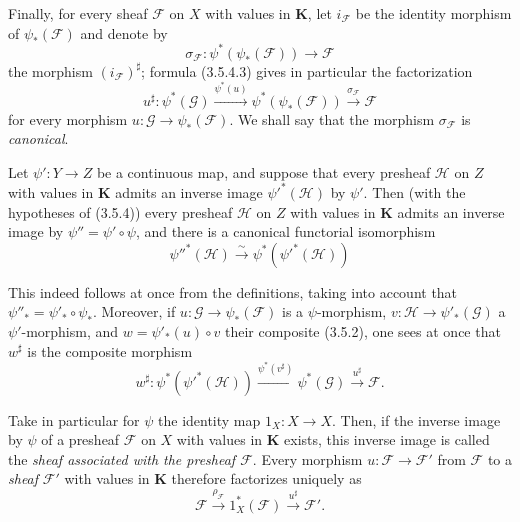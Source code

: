 \begin{env}[3.5.4]
Finally, for every sheaf $\mathcal{F}$ on $X$ with values in
$\mathbf{K}$, let $i_{\mathcal{F}}$ be the identity morphism of
$\psi_*(\mathcal{F})$ and denote by
\[
  \sigma_{\mathcal{F}}:
  \psi^*(\psi_*(\mathcal{F}))\to\mathcal{F}
\]
the morphism $(i_{\mathcal{F}})^\sharp$; formula (3.5.4.3) gives in
particular the factorization
\begin{equation*}
  u^\sharp:\psi^*(\mathcal{G})
  \xrightarrow{\psi^*(u)}
  \psi^*(\psi_*(\mathcal{F}))
  \xrightarrow{\sigma_{\mathcal{F}}}\mathcal{F}
\tag{3.5.4.4}\label{0.3.5.4.4}
\end{equation*}
for every morphism $u:\mathcal{G}\to\psi_*(\mathcal{F})$. We shall say that the
morphism $\sigma_{\mathcal{F}}$ is \emph{canonical}.
\end{env}

\begin{env}[3.5.5]
\label{0.3.5.5}
Let $\psi':Y\to Z$ be a continuous map, and suppose that every
presheaf $\mathcal{H}$ on $Z$ with values in $\mathbf{K}$ admits an
inverse image $\psi'^*(\mathcal{H})$ by $\psi'$. Then (with the
hypotheses of (3.5.4)) every presheaf $\mathcal{H}$ on $Z$ with values in
$\mathbf{K}$ admits an inverse image by $\psi''=\psi'\circ\psi$, and there is
a canonical functorial isomorphism
\begin{equation*}
  \psi''^*(\mathcal{H})\xrightarrow{\sim}
  \psi^*(\psi'^*(\mathcal{H}))
\tag{3.5.5.1}\label{0.3.5.5.1}
\end{equation*}


This indeed follows at once from the definitions, taking into account that
$\psi''_*=\psi'_*\circ\psi_*$. Moreover, if
$u:\mathcal{G}\to\psi_*(\mathcal{F})$ is a $\psi$-morphism,
$v:\mathcal{H}\to\psi'_*(\mathcal{G})$ a $\psi'$-morphism, and
$w=\psi'_*(u)\circ v$ their composite (3.5.2), one sees at once that
$w^\sharp$ is the composite morphism
\[
  w^\sharp:\psi^*(\psi'^*(\mathcal{H}))
  \xrightarrow{\psi^*(v^\sharp)}
  \psi^*(\mathcal{G})
  \xrightarrow{u^\sharp}\mathcal{F}.
\]
\end{env}

\begin{env}[3.5.6]
\label{0.3.5.6}
Take in particular for $\psi$ the identity map
$1_X:X\to X$. Then, if the inverse image by $\psi$ of a presheaf
$\mathcal{F}$ on $X$ with values in $\mathbf{K}$ exists, this
inverse image is called the \emph{sheaf associated with the presheaf $\mathcal{F}$}.
Every morphism $u:\mathcal{F}\to\mathcal{F}'$ from $\mathcal{F}$ to a
\emph{sheaf} $\mathcal{F}'$ with values in $\mathbf{K}$ therefore factorizes
uniquely as
\[
  \mathcal{F}\xrightarrow{\rho_{\mathcal{F}}}
  1_X^*(\mathcal{F})\xrightarrow{u^\sharp}\mathcal{F}'.
\]
\end{env}


